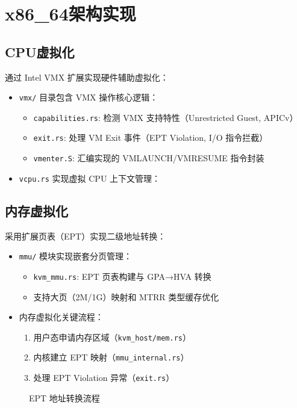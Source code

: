 \documentclass{mancls}
\begin{document}
\section{x86\_64架构实现}
\subsection{CPU虚拟化}
通过 Intel VMX 扩展实现硬件辅助虚拟化：
\begin{itemize}
    \item \texttt{vmx/} 目录包含 VMX 操作核心逻辑：
    \begin{itemize}
        \item \texttt{capabilities.rs}: 检测 VMX 支持特性（Unrestricted Guest, APICv）
        \item \texttt{exit.rs}: 处理 VM Exit 事件（EPT Violation, I/O 指令拦截）
        \item \texttt{vmenter.S}: 汇编实现的 VMLAUNCH/VMRESUME 指令封装
    \end{itemize}
    \item \texttt{vcpu.rs} 实现虚拟 CPU 上下文管理：
\end{itemize}

\subsection{内存虚拟化}
采用扩展页表（EPT）实现二级地址转换：
\begin{itemize}
    \item \texttt{mmu/} 模块实现嵌套分页管理：
    \begin{itemize}
        \item \texttt{kvm\_mmu.rs}: EPT 页表构建与 GPA→HVA 转换
        \item 支持大页（2M/1G）映射和 MTRR 类型缓存优化
    \end{itemize}
    \item 内存虚拟化关键流程：
    \begin{enumerate}
        \item 用户态申请内存区域（\texttt{kvm\_host/mem.rs}）
        \item 内核建立 EPT 映射（\texttt{mmu\_internal.rs}）
        \item 处理 EPT Violation 异常（\texttt{exit.rs}）
    \end{enumerate}
\end{itemize}

\begin{figure}[htbp]
\centering
{}
\caption{EPT 地址转换流程}
\end{figure}
\end{document}
